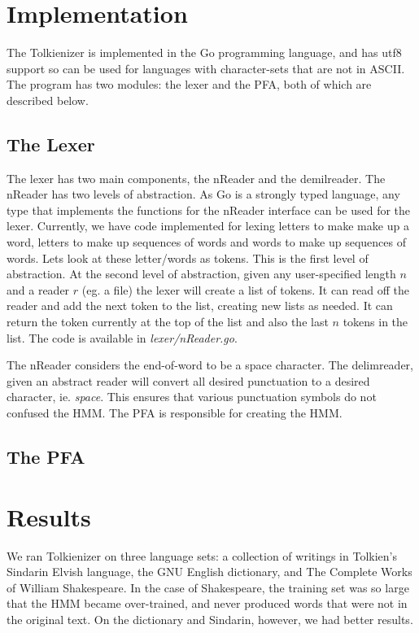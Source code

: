 \documentclass[10pt]{article}
\begin{document}
\section{Implementation}
The Tolkienizer is implemented in the Go programming language, and has utf8
support so can be used for languages with character-sets that are not in
ASCII. The program has two modules: the lexer and the PFA, both of which 
are described below.
\subsection{The Lexer}
The lexer has two main components, the nReader and the demilreader.
The nReader has two levels of abstraction. As Go is a strongly
typed language, any type that implements the functions for the nReader interface
can be used for the lexer. Currently, we have code implemented for lexing
letters to make make up a word, letters to make up sequences of words and words
to make up sequences of words. Lets look at these letter/words as tokens. 
This is the first level of abstraction. At the
second level of abstraction, given any user-specified length $n$ and a reader $r$ (eg. a file)
the lexer will create a list of tokens. It can read off the reader and add the
next token to the list, creating new lists as needed. It can return the token
currently at the top of the list and also the last $n$ tokens in the list. The code
is available in \textit{lexer/nReader.go}. 

The nReader considers the end-of-word to be a space character. The delimreader,
given an abstract reader will convert all desired punctuation to a desired
character, ie. \textit{space}. This ensures that various punctuation symbols do
not confused the HMM. The PFA is responsible for creating the HMM.
\subsection{The PFA}

\section{Results}

We ran Tolkienizer on three language sets: a collection of writings in
Tolkien's Sindarin Elvish language, the GNU English dictionary, and The
Complete Works of William Shakespeare. In the case of Shakespeare, the training set
was so large that the HMM became over-trained, and never produced words that
were not in the original text. On the dictionary and Sindarin, however, we had
better results.
\end{document}

